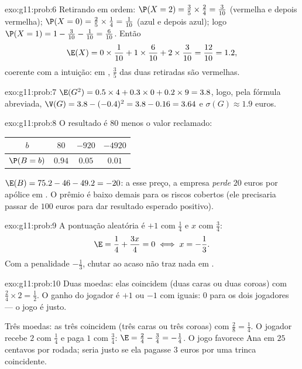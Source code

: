 \begin{solution}{exo:g11:prob:6}
Retirando em ordem: $\P(X = 2) = \frac35 \times \frac24 = \frac{3}{10}$
(vermelha e depois vermelha);
$\P(X = 0) = \frac25 \times \frac14 = \frac{1}{10}$ (azul e depois
azul); logo $\P(X = 1) = 1 - \frac{3}{10} - \frac{1}{10} =
\frac{6}{10}$. Então
\[
\E(X) = 0 \times \frac1{10} + 1 \times \frac6{10} + 2 \times \frac3{10}
= \frac{12}{10} = 1.2 ,
\]
coerente com a intuição: em , $\frac35$ das duas retiradas são
vermelhas.
\end{solution}

\begin{solution}{exo:g11:prob:7}
$\E(G^2) = 0.5 \times 4 + 0.3 \times 0 + 0.2 \times 9 = 3.8$, logo, pela
fórmula abreviada, $\V(G) = 3.8 - (-0.4)^2 = 3.8 - 0.16 = 3.64$ e
$\sigma(G) \approx 1.9$ euros.
\end{solution}

\begin{solution}{exo:g11:prob:8}
O resultado é $80$ menos o valor reclamado:
\begin{center}
\begin{tabular}{c|ccc}
$b$ & $80$ & $-920$ & $-4920$\\
\hline
$\P(B=b)$ & $0.94$ & $0.05$ & $0.01$
\end{tabular}
\end{center}
$\E(B) = 75.2 - 46 - 49.2 = -20$: a esse preço, a empresa \emph{perde}
$20$ euros por apólice em . O prêmio é baixo demais para os riscos
cobertos (ele precisaria passar de $100$ euros para dar resultado
esperado positivo).
\end{solution}

\begin{solution}{exo:g11:prob:9}
A pontuação aleatória é $+1$ com  $\frac14$ e $x$ com
 $\frac34$:
\[
\E = \frac14 + \frac{3x}{4} = 0 \iff x = -\frac13 .
\]
Com a penalidade $-\frac13$, chutar ao acaso não traz nada em .
\end{solution}

\begin{solution}{exo:g11:prob:10}
Duas moedas: elas coincidem (duas caras ou duas coroas) com
 $\frac24 \times 2 = \frac12$. O ganho do jogador é $+1$ ou
$-1$ com  iguais:  $0$ para os dois jogadores ---
o jogo é justo.

Três moedas: as três coincidem (três caras ou três coroas) com
 $\frac{2}{8} = \frac14$. O jogador recebe $2$ com
 $\frac14$ e paga $1$ com  $\frac34$:
$\E = \frac24 - \frac34 = -\frac14$. O jogo favorece Ana em $25$
centavos por rodada; seria justo se ela pagasse $3$ euros por uma trinca
coincidente.
\end{solution}

